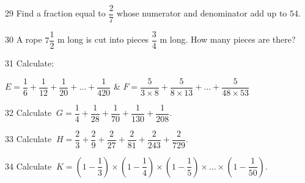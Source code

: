 \gap
\begin{probbox}{29}{\relax}
Find a fraction equal to $\dfrac27$ whose numerator and denominator add up to $54$.
\end{probbox}
\gap
\begin{probbox}{30}{\relax}
A rope $7\dfrac12$ m long is cut into pieces $\dfrac34$ m long. How many pieces are there?
\end{probbox}
\begin{probbox}{31}{}
Calculate:
\begin{cols2}
$E=\dfrac16+\dfrac1{12}+\dfrac1{20}+\dots+\dfrac1{420}$ & $F=\dfrac5{3\times8}+\dfrac5{8\times13}+\dots+\dfrac5{48\times53}$
\end{cols2}
\end{probbox}
\gap
\begin{probbox}{32}{}
Calculate $\ G=\dfrac14+\dfrac1{28}+\dfrac1{70}+\dfrac1{130}+\dfrac1{208}$.
\end{probbox}
\gap
\begin{probbox}{33}{}
Calculate $\ H=\dfrac23+\dfrac29+\dfrac2{27}+\dfrac2{81}+\dfrac2{243}+\dfrac2{729}$.
\end{probbox}
\gap
\begin{probbox}{34}{}
Calculate $\ K=\left(1-\dfrac13\right)\times\left(1-\dfrac14\right)\times\left(1-\dfrac15\right)\times\dots\times\left(1-\dfrac1{50}\right)$.
\end{probbox}

